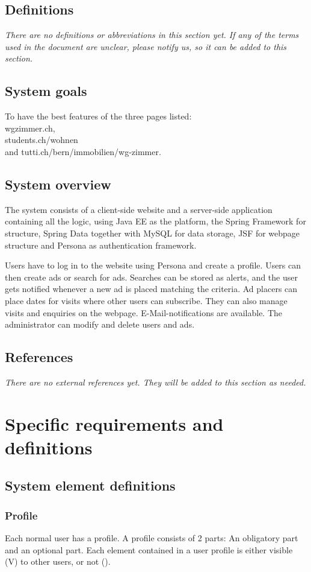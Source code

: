\documentclass[a4wide]{article}
\begin{document}
\subsection{Definitions}
\textit{There are no definitions or abbreviations in this section yet. If any of the terms used in the document are unclear, please notify us, so it can be added to this section.}
\subsection{System goals}
To have the best features of the three pages listed: \\
wgzimmer.ch, \\
students.ch/wohnen \\
and tutti.ch/bern/immobilien/wg-zimmer.

\subsection{System overview}
The system consists of a client-side website and a server-side application containing all the logic, using Java EE as the platform, the Spring Framework for structure, Spring Data together with MySQL for data storage, JSF for webpage structure and Persona as authentication framework.

Users have to log in to the website using Persona and create a profile. Users can then create ads or search for ads. Searches can be stored as alerts, and the user gets notified whenever a new ad is placed matching the criteria. Ad placers can place dates for visits where other users can subscribe. They can also manage visits and enquiries on the webpage. E-Mail-notifications are available.
The administrator can modify and delete users and ads.

\subsection{References}
\textit{There are no external references yet. They will be added to this section as needed.}
\section{Specific requirements and definitions}
\subsection{System element definitions}
\subsubsection{Profile}
Each normal user has a profile. 
A profile consists of 2 parts: An obligatory part and an optional part.
Each element contained in a user profile is either visible (V) to other users, or not ().
\end{document}
